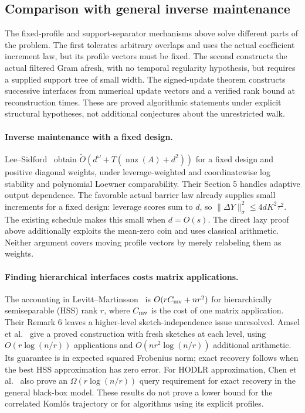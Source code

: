 \documentclass[11pt]{amsart}
\theoremstyle{definition}\newtheorem{definition}[theorem]{Definition}
\theoremstyle{remark}\newtheorem{remark}[theorem]{Remark}
\numberwithin{equation}{section}
\begin{document}
\subsection{Comparison with general inverse maintenance}

The fixed-profile and support-separator mechanisms above solve different
parts of the problem. The first tolerates arbitrary overlaps and uses the
actual coefficient increment law, but its profile vectors must be fixed.
The second constructs the actual filtered Gram afresh, with no temporal
regularity hypothesis, but requires a supplied support tree of small width.
The signed-update theorem constructs successive interfaces from numerical
update vectors and a verified rank bound at reconstruction times. These
are proved algorithmic statements under explicit structural hypotheses,
not additional conjectures about the unrestricted walk.

\paragraph{Inverse maintenance with a fixed design.}
Lee--Sidford~\cite[Definition 4 and Theorem 13]{LSmaint} obtain
$\widetilde O(d^\omega+T(\operatorname{nnz}(A)+d^2))$ for a fixed
design and positive diagonal weights, under leverage-weighted and
coordinatewise log stability and polynomial Loewner comparability.
Their Section 5 handles adaptive output dependence. The favorable actual
barrier law already supplies small increments for a fixed design:
leverage scores sum to $d$, so
$\|\Delta Y\|_\sigma^2\le4dK^2\tau^2$.
The existing schedule makes this small when $d=O(s)$.
The direct lazy proof above additionally exploits the mean-zero coin and
uses classical arithmetic. Neither argument covers moving profile vectors
by merely relabeling them as weights.

\paragraph{Finding hierarchical interfaces costs matrix applications.}
The accounting in Levitt--Martinsson~\cite[Section 4.4]{levitt}
is $O(rC_{\rm mv}+nr^2)$ for hierarchically semiseparable (HSS) rank $r$, where $C_{\rm mv}$ is the
cost of one matrix application. Their Remark 6 leaves a higher-level
sketch-independence issue unresolved. Amsel et al.~\cite[Theorem 13]{hss2026}
give a proved construction with fresh sketches at each level, using
$O(r\log(n/r))$ applications and $O(nr^2\log(n/r))$ additional arithmetic.
Its guarantee is in expected squared Frobenius norm; exact recovery follows
when the best HSS approximation has zero error. For HODLR approximation,
Chen et al.~\cite[Theorem 1.2]{hodlr2025} also prove an
$\Omega(r\log(n/r))$ query requirement for exact recovery in the
general black-box model. These results do not prove a lower bound for the
correlated Koml\'os trajectory or for algorithms using its explicit profiles.
\end{document}
